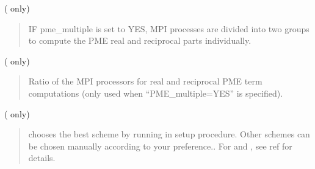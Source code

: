 \documentclass[a4paper,11pt,oneside,english]{sphinxmanual}
\begin{document}
  ( only)
\begin{quote}


IF pme\_multiple is set to YES, MPI processes are divided into two groups
to compute the PME real and reciprocal parts individually.
\end{quote}

  ( only)
\begin{quote}


Ratio of the MPI processors for real and reciprocal PME term computations
(only used when “PME\_multiple=YES” is specified).
\end{quote}

  ( only)
\begin{quote}


 chooses the best scheme by running in setup procedure.
Other schemes can be chosen manually according to your preference..
For  and , see ref  for details.
\end{quote}
\end{document}
